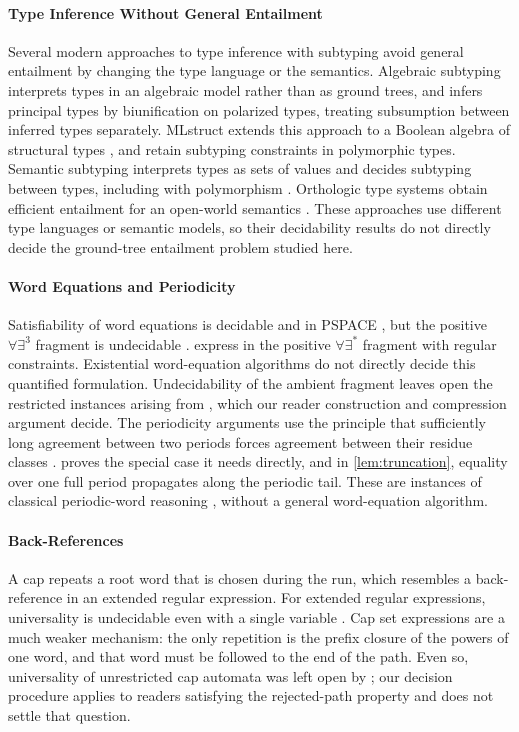 \paragraph{Type Inference Without General Entailment}
Several modern approaches to type inference with subtyping avoid general entailment by
changing the type language or the semantics. Algebraic subtyping
\citep{Dolan16,DolanMycroft17,Parreaux20} interprets types in an algebraic model rather than
as ground trees, and infers principal types by biunification on polarized types, treating
subsumption between inferred types separately. MLstruct extends this approach to a Boolean
algebra of structural types \citep{ParreauxChau22}, and \citet{ParreauxEtAl24} retain
subtyping constraints in polymorphic types. Semantic subtyping interprets types as sets of
values and decides subtyping between types, including with polymorphism
\citep{CastagnaXu11,GesbertGenevesLayaida15}. Orthologic type systems obtain efficient
entailment for an open-world semantics \citep{GuilloudKuncak25}. These approaches use different type languages or semantic models, so their
decidability results do not directly decide the ground-tree entailment
problem studied here.

\paragraph{Word Equations and Periodicity}
Satisfiability of word equations is decidable \citep{Makanin77} and in PSPACE
\citep{Plandowski04}, but the positive $\forall\exists^3$ fragment is undecidable
\citep{Durnev95}. \citet[Corollary~2]{NiehrenPriesnitz03} express \NSSE in the positive
$\forall\exists^*$ fragment with regular constraints. Existential word-equation algorithms do not
directly decide this quantified formulation. Undecidability of the ambient
fragment leaves open the restricted instances arising from \NSSE, which
our reader construction and compression argument decide.
The periodicity arguments use the principle that sufficiently long agreement
between two periods forces agreement between their residue classes
\citep{FineWilf65}.  proves the special case it needs
directly, and in \cref{lem:truncation}, equality over one full period
propagates along the periodic tail. These are instances of classical
periodic-word reasoning \citep{Lothaire02}, without a general word-equation
algorithm.

\paragraph{Back-References}
A cap repeats a root word that is chosen during the run, which resembles a back-reference in
an extended regular expression. For extended regular expressions, universality is
undecidable even with a single variable \citep{Freydenberger11}. Cap set expressions are a
much weaker mechanism: the only repetition is the prefix closure of the powers of one word,
and that word must be followed to the end of the path. Even so, universality of unrestricted
cap automata was left open by \citet[Section~10]{NiehrenPriesnitz03};
our decision procedure applies to readers satisfying the rejected-path property
and does not settle that question.

